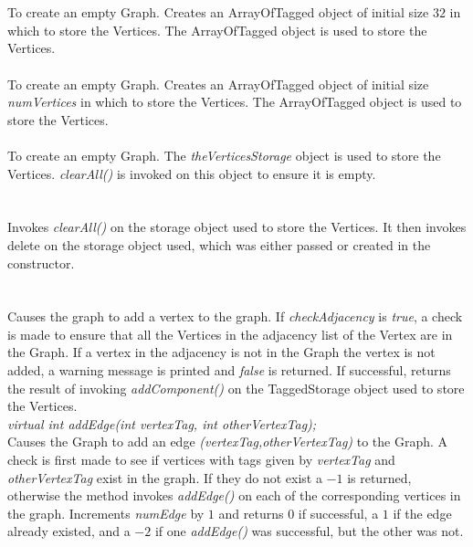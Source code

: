   \\
  \\
To create an empty Graph. Creates an ArrayOfTagged object of initial
size $32$ in which to store the Vertices. The ArrayOfTagged object is
used to store the Vertices.\\

 \\
To create an empty Graph. Creates an ArrayOfTagged object of initial
size {\em numVertices} in which to store the Vertices. The
ArrayOfTagged object is used to store the Vertices. \\ 

\\ 
To create an empty Graph. The {\em theVerticesStorage} object is used to
store the Vertices. {\em clearAll()} is invoked on this object to
ensure it is empty. \\

  \\
  \\
Invokes {\em clearAll()} on the storage object used to store the
Vertices. It then invokes delete on the storage object used, which was
either passed or created in the constructor. \\

  \\
 \\
Causes the graph to add a vertex to the graph. If {\em checkAdjacency}
is {\em true}, a check is made to ensure that all the Vertices in the
adjacency list of the Vertex are in the Graph. If a vertex in the
adjacency is not in the Graph the vertex is not added, a warning
message is printed and {\em false} is returned. If successful,
returns the result of invoking {\em addComponent()} on the
TaggedStorage object used to store the Vertices. \\



{\em virtual int addEdge(int vertexTag, int otherVertexTag); } \\
Causes the Graph to add an edge {\em (vertexTag,otherVertexTag)} to
the Graph. A check is first made to see if vertices with tags given by
{\em vertexTag} and {\em otherVertexTag} exist in the graph. If they
do not exist a $-1$ is returned, otherwise the method invokes {\em
addEdge()} on each of the corresponding vertices in the 
graph. Increments {\em numEdge} by $1$ and returns $0$ if successful,
a $1$ if the edge already existed, and a $-2$ if one {\em addEdge()}
was successful, but the other was not.\\  

